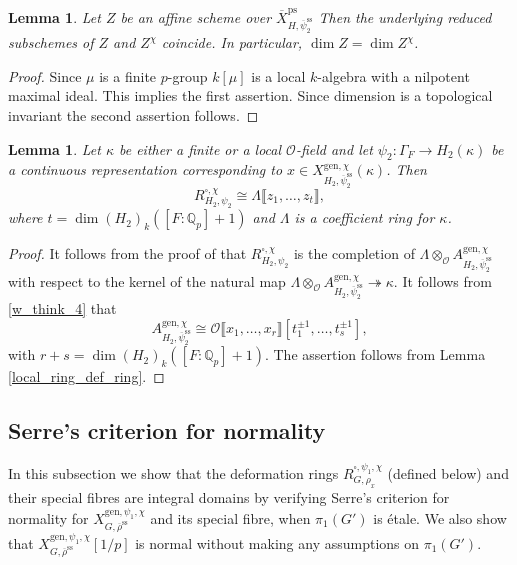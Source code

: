 \documentclass{amsart}
\newtheorem{lem}[prop]{Lemma}
\theoremstyle{definition}
\theoremstyle{remark}
\newcommand{\Qp}{\mathbb {Q}_p}
\newcommand{\OO}{\mathcal O}
\newcommand{\br}[1]{\llbracket #1\rrbracket}
\newcommand{\rhobar}{\overline{\rho}}
\newcommand{\ps}{\mathrm{ps}}
\newcommand{\gen}{\mathrm{gen}}
\newcommand{\Xbar}{\overline{X}}
\newcommand{\rhobarss}{\rhobar^{\mathrm{ss}}}
\newcommand{\psibar}{\overline{\psi}}
\newcommand{\psibarss}{\psibar^{\mathrm {ss}}}
\begin{document}
\begin{lem}\label{dim_XgenG_chi} Let $Z$ be an affine scheme over $\Xbar^{\ps}_{H, \psibarss_2}$  
Then the underlying reduced subschemes of $Z$  and $Z^{\chi}$
coincide. In particular, $\dim Z = \dim Z^{\chi}$.
\end{lem}
\begin{proof} Since $\mu$ is a finite $p$-group $k[\mu]$ is a local $k$-algebra with a nilpotent maximal 
ideal. This implies the first assertion. Since dimension is a topological invariant 
the second assertion follows. 
\end{proof}


\begin{lem}\label{form_sm_chi} Let $\kappa$ be either a finite or a local $\OO$-field and  
let $\psi_2: \Gamma_F\rightarrow H_2(\kappa)$ be a continuous representation corresponding to $x\in X^{\gen, \chi}_{H_2, \psibarss_2}(\kappa)$.  Then 
$$R^{\square,\chi}_{H_2, \psi_2}\cong \Lambda\br{z_1,\ldots, z_t},$$
where $t=\dim (H_2)_k([F:\Qp]+1)$ and $\Lambda$ is a coefficient ring for $\kappa$.
\end{lem}
\begin{proof} 
It follows from the proof of  that $R^{\square,\chi}_{H_2, \psi_2}$
is the completion of $ \Lambda\otimes_{\OO} A^{\gen, \chi}_{H_2,\psibarss_2}$ with respect to 
 the kernel of the natural map 
$ \Lambda\otimes_{\OO} A^{\gen, \chi}_{H_2,\psibarss_2}\twoheadrightarrow \kappa.$
It follows from \eqref{w_think_4} that 
\begin{equation}\label{Agen_chi}
A^{\gen, \chi}_{H_2,\psibarss_2}\cong \OO\br{x_1,\ldots, x_r}[t_1^{\pm 1}, \ldots, 
t_s^{\pm 1}],
\end{equation}
with $r+s =\dim (H_2)_k ([F:\Qp]+1)$. The assertion 
follows from Lemma \ref{local_ring_def_ring}.
\end{proof} 



\subsection{Serre's criterion for normality} In this subsection we show that the deformation rings 
$R^{\square, \psi_1, \chi}_{G, \rho_x}$ (defined below) and their special fibres are integral domains
by verifying Serre's criterion for normality for $X^{\gen, \psi_1, \chi}_{G, \rhobarss}$ and its special fibre, when $\pi_1(G')$ is \'etale. We also 
show that $X^{\gen, \psi_1, \chi}_{G, \rhobarss}[1/p]$ is normal without making any assumptions
on $\pi_1(G')$.
\end{document}
